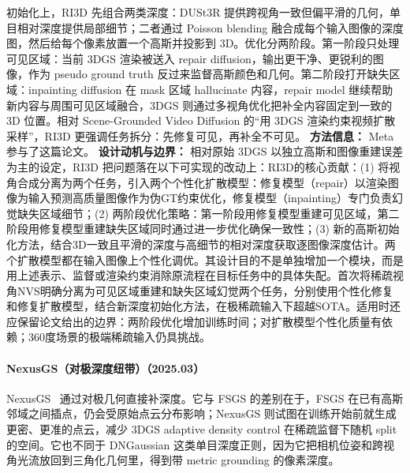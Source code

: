 初始化上，RI3D 先组合两类深度：DUSt3R 提供跨视角一致但偏平滑的几何，单目相对深度提供局部细节；二者通过 Poisson blending 融合成每个输入图像的深度图，然后给每个像素放置一个高斯并投影到 3D。优化分两阶段。第一阶段只处理可见区域：当前 3DGS 渲染被送入 repair diffusion，输出更干净、更锐利的图像，作为 pseudo ground truth 反过来监督高斯颜色和几何。第二阶段打开缺失区域：inpainting diffusion 在 mask 区域 hallucinate 内容，repair model 继续帮助新内容与周围可见区域融合，3DGS 则通过多视角优化把补全内容固定到一致的 3D 位置。相对 Scene-Grounded Video Diffusion 的“用 3DGS 渲染约束视频扩散采样”，RI3D 更强调任务拆分：先修复可见，再补全不可见。
\textbf{方法信息：} Meta 参与了这篇论文。
\textbf{设计动机与边界：} 相对原始 3DGS 以独立高斯和图像重建误差为主的设定，RI3D 把问题落在以下可实现的改动上：RI3D的核心贡献：(1) 将视角合成分离为两个任务，引入两个个性化扩散模型：修复模型（repair）以渲染图像为输入预测高质量图像作为伪GT约束优化，修复模型（inpainting）专门负责幻觉缺失区域细节；(2) 两阶段优化策略：第一阶段用修复模型重建可见区域，第二阶段用修复模型重建缺失区域同时通过进一步优化确保一致性；(3) 新的高斯初始化方法，结合3D一致且平滑的深度与高细节的相对深度获取逐图像深度估计。两个扩散模型都在输入图像上个性化调优。其设计目的不是单独增加一个模块，而是用上述表示、监督或渲染约束消除原流程在目标任务中的具体失配。首次将稀疏视角NVS明确分离为可见区域重建和缺失区域幻觉两个任务，分别使用个性化修复和修复扩散模型，结合新深度初始化方法，在极稀疏输入下超越SOTA。适用时还应保留论文给出的边界：两阶段优化增加训练时间；对扩散模型个性化质量有依赖；360度场景的极端稀疏输入仍具挑战。
\paragraph{NexusGS（对极深度纽带）（2025.03）}
NexusGS~\cite{2503_18794} 通过对极几何直接补深度。它与 FSGS 的差别在于，FSGS 在已有高斯邻域之间插点，仍会受原始点云分布影响；NexusGS 则试图在训练开始前就生成更密、更准的点云，减少 3DGS adaptive density control 在稀疏监督下随机 split 的空间。它也不同于 DNGaussian 这类单目深度正则，因为它把相机位姿和跨视角光流放回到三角化几何里，得到带 metric grounding 的像素深度。

